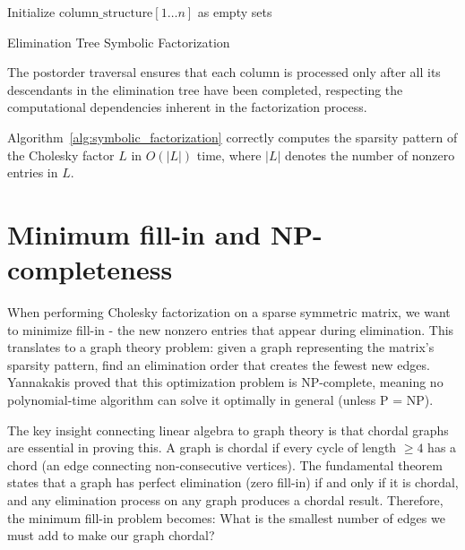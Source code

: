 \begin{algorithm}
\BlankLine
Initialize $\text{column\_structure}[1 \ldots n]$ as empty sets\;
\caption{Elimination Tree Symbolic Factorization}
\label{alg:symbolic_factorization}
\end{algorithm}

The postorder traversal ensures that each column is processed only after all its descendants in the elimination tree have been completed, respecting the computational dependencies inherent in the factorization process.

\begin{theorem}
Algorithm~\ref{alg:symbolic_factorization} correctly computes the sparsity pattern of the Cholesky factor $L$ in $O(|L|)$ time, where $|L|$ denotes the number of nonzero entries in $L$.
\end{theorem}

\newpage


\section{Minimum fill-in and NP-completeness}

When performing Cholesky factorization on a sparse symmetric matrix, we want to minimize fill-in - the new nonzero entries that appear during elimination. This translates to a graph theory problem: given a graph representing the matrix's sparsity pattern, find an elimination order that creates the fewest new edges. Yannakakis \cite{yannakakis_computing_1981} proved that this optimization problem is NP-complete, meaning no polynomial-time algorithm can solve it optimally in general (unless P = NP).

The key insight connecting linear algebra to graph theory is that chordal graphs are essential in proving this. A graph is chordal if every cycle of length $\geq 4$ has a chord (an edge connecting non-consecutive vertices). The fundamental theorem states that a graph has perfect elimination (zero fill-in) if and only if it is chordal, and any elimination process on any graph produces a chordal result. Therefore, the minimum fill-in problem becomes: What is the smallest number of edges we must add to make our graph chordal?

